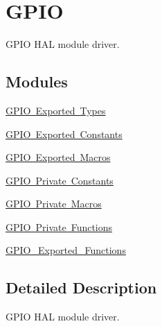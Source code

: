 \hypertarget{group___g_p_i_o}{}\section{G\+P\+IO}
\label{group___g_p_i_o}


G\+P\+IO H\+AL module driver.  


\subsection*{Modules}
\begin{DoxyCompactItemize}
\item 
\mbox{\hyperlink{group___g_p_i_o___exported___types}{G\+P\+I\+O Exported Types}}
\item 
\mbox{\hyperlink{group___g_p_i_o___exported___constants}{G\+P\+I\+O Exported Constants}}
\item 
\mbox{\hyperlink{group___g_p_i_o___exported___macros}{G\+P\+I\+O Exported Macros}}
\item 
\mbox{\hyperlink{group___g_p_i_o___private___constants}{G\+P\+I\+O Private Constants}}
\item 
\mbox{\hyperlink{group___g_p_i_o___private___macros}{G\+P\+I\+O Private Macros}}
\item 
\mbox{\hyperlink{group___g_p_i_o___private___functions}{G\+P\+I\+O Private Functions}}
\item 
\mbox{\hyperlink{group___g_p_i_o___exported___functions}{G\+P\+I\+O\+\_\+\+Exported\+\_\+\+Functions}}
\end{DoxyCompactItemize}


\subsection{Detailed Description}
G\+P\+IO H\+AL module driver. 


